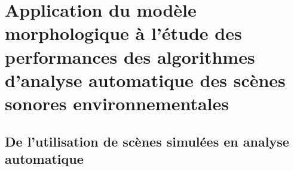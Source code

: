 \chapter{Application du modèle morphologique à l’étude des performances des algorithmes d'analyse automatique des scènes sonores environnementales}\label{ch:ml_simuperf}

\section{De l'utilisation de scènes simulées en analyse automatique}




